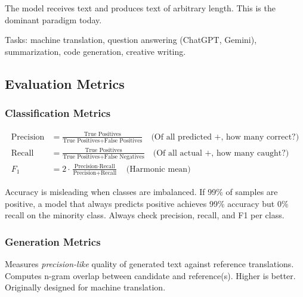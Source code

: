 \documentclass[11pt, a4paper]{article}
\begin{document}
The model receives text and produces text of arbitrary length. This is the dominant paradigm today.

Tasks: machine translation, question answering (ChatGPT, Gemini), summarization, code generation, creative writing.

\subsection{Evaluation Metrics}

\subsubsection{Classification Metrics}

\begin{defbox}
\begin{align}
\text{Precision} &= \frac{\text{True Positives}}{\text{True Positives} + \text{False Positives}} \quad \text{(Of all predicted +, how many correct?)} \\[4pt]
\text{Recall} &= \frac{\text{True Positives}}{\text{True Positives} + \text{False Negatives}} \quad \text{(Of all actual +, how many caught?)} \\[4pt]
F_1 &= 2 \cdot \frac{\text{Precision} \cdot \text{Recall}}{\text{Precision} + \text{Recall}} \quad \text{(Harmonic mean)}
\end{align}
\end{defbox}

\begin{warnbox}
Accuracy is misleading when classes are imbalanced. If 99\% of samples are positive, a model that always predicts positive achieves 99\% accuracy but 0\% recall on the minority class. Always check precision, recall, and F1 per class.
\end{warnbox}

\subsubsection{Generation Metrics}

\begin{defbox}
Measures \emph{precision-like} quality of generated text against reference translations. Computes n-gram overlap between candidate and reference(s). Higher is better. Originally designed for machine translation.
\end{defbox}
\end{document}
